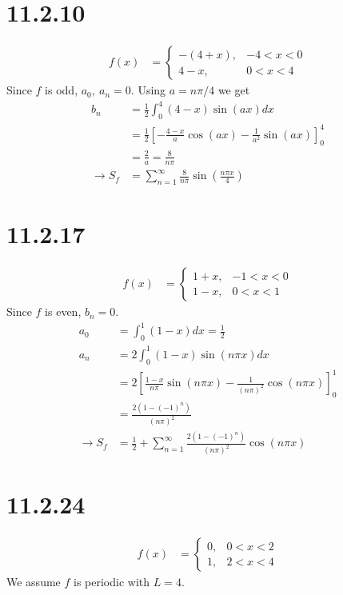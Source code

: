 \documentclass[11pt,a4paper]{article}
\begin{document}
\section*{11.2.10}
\begin{align*}
    f(x) &=
        \left\{\begin{matrix}
        -(4+x), &-4<x<0 \\ 
        4-x, &0<x<4 
        \end{matrix}\right.
\end{align*}
Since $f$ is odd, $a_0,\ a_n = 0$. Using $a = n\pi/4$ we get
\begin{align*}
    b_n &= \frac{1}{2} \int_0^4 (4-x)\sin(ax)dx \\
    &= \frac{1}{2} \left[
        - \frac{4-x}{a}\cos(ax) - \frac{1}{a^2}\sin(ax)
    \right]_0^4 \\
    &= \frac{2}{a} = \frac{8}{n\pi} \\
    \rightarrow S_f
    &= \sum_{n=1}^\infty \frac{8}{n\pi}\sin\left(\frac{n\pi x}{4}\right)
\end{align*}

\section*{11.2.17}
\begin{align*}
    f(x) &=
        \left\{\begin{matrix}
        1+x, &-1<x<0 \\ 
        1-x, &0<x<1 
        \end{matrix}\right.
\end{align*}
Since $f$ is even, $b_n = 0$.
\begin{align*}
    a_0 &= \int_0^1 (1-x)dx = \frac{1}{2} \\
    a_n &= 2\int_0^1 (1-x)\sin(n\pi x)dx \\
    &= 2 \left[
        \frac{1-x}{n\pi}\sin(n\pi x) - \frac{1}{(n\pi)^2}\cos(n\pi x)
    \right]_0^1 \\
    &= \frac{2(1-(-1)^n)}{(n\pi)^2} \\
    \rightarrow S_f
    &= \frac{1}{2} + \sum_{n=1}^\infty \frac{2(1-(-1)^n)}{(n\pi)^2} \cos(n\pi x)
\end{align*}

\newpage
\section*{11.2.24}
\begin{align*}
    f(x) &=
        \left\{\begin{matrix}
        0, &0<x<2 \\ 
        1, &2<x<4 
        \end{matrix}\right.
\end{align*}
We assume $f$ is periodic with $L = 4$.
\end{document}
